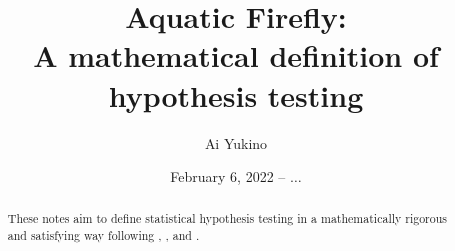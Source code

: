 \documentclass{article}
\begin{document}
\title{Aquatic Firefly:\\
	\large\color{subtitle} A mathematical definition of hypothesis testing}
\author{Ai Yukino}
\date{February 6, 2022 -- $\dots$}
\maketitle
\hypersetup{linkcolor = internallinkcolor}
\tableofcontents
\hypersetup{linkcolor= .}

\begin{abstract}
	These notes aim to define statistical hypothesis testing in a mathematically rigorous and satisfying way following \cite{shao2003}, \cite{casella2021statistical}, and \cite{siegrist2021}.
\end{abstract}



\end{document}
